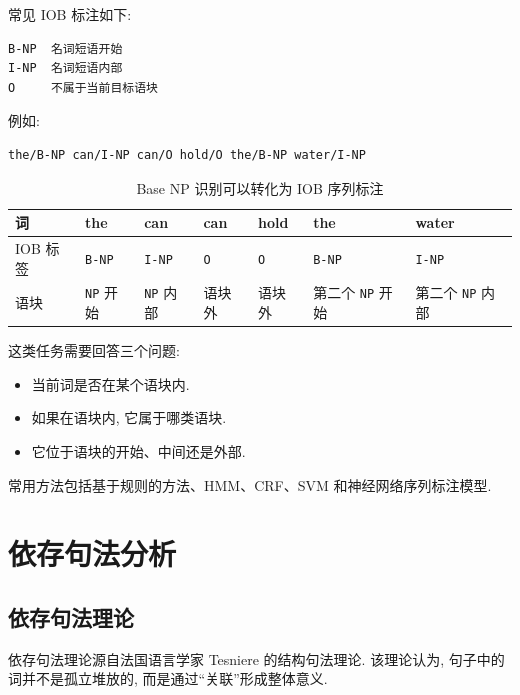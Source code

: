常见 IOB 标注如下:

\begin{Verbatim}[breaklines=true,breakanywhere=true,fontsize=\small]
B-NP  名词短语开始
I-NP  名词短语内部
O     不属于当前目标语块
\end{Verbatim}

例如:

\begin{Verbatim}[breaklines=true,breakanywhere=true,fontsize=\small]
the/B-NP can/I-NP can/O hold/O the/B-NP water/I-NP
\end{Verbatim}

\begin{table}[H]
\centering
\begingroup
\setlength{\tabcolsep}{2pt}
\scriptsize
\caption{Base NP 识别可以转化为 IOB 序列标注}
\begin{tabular}{|p{}|p{}|p{}|p{}|p{}|p{}|p{}|}
\hline
词 & the & can & can & hold & the & water \\ \hline
IOB 标签 & \texttt{B-NP} & \texttt{I-NP} & \texttt{O} & \texttt{O} & \texttt{B-NP} & \texttt{I-NP} \\ \hline
语块 & \texttt{NP} 开始 & \texttt{NP} 内部 & 语块外 & 语块外 & 第二个 \texttt{NP} 开始 & 第二个 \texttt{NP} 内部 \\ \hline
\end{tabular}
\endgroup
\end{table}

这类任务需要回答三个问题:

\begin{itemize}
\item 当前词是否在某个语块内.
\item 如果在语块内, 它属于哪类语块.
\item 它位于语块的开始、中间还是外部.
\end{itemize}

常用方法包括基于规则的方法、HMM、CRF、SVM 和神经网络序列标注模型.

\section{依存句法分析}


\subsection{依存句法理论}


依存句法理论源自法国语言学家 Tesniere 的结构句法理论.
该理论认为, 句子中的词并不是孤立堆放的, 而是通过“关联”形成整体意义.

